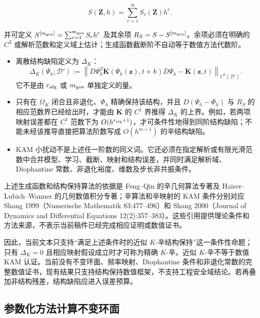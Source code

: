 \begin{equation}
\label{eq:symplectic-kam-5-14}
S\left( \mathbf{Z},h \right) = \sum_{r = 1}^{\infty}S_{r}\left( \mathbf{Z} \right)h^{r}.
\end{equation}

并可定义 \(S^{[m_{\rm gen}]}=\sum_{r=1}^{m_{\rm gen}}S_rh^r\) 及其余项 \(R_S=S-S^{[m_{\rm gen}]}\)。余项必须在明确的 \(C^{2}\) 或解析范数和定义域上估计；生成函数截断阶不自动等于数值方法代数阶。

\begin{itemize}
\tightlist
\item
  离散结构缺陷定义为 \(\Delta_K\)：
  \[
  \Delta_{K}(\Psi_h;\mathcal{D}'):=\left\|D\Psi_h^{T}\mathbf{K}\left(\Psi_h(\mathbf{z}),t+h\right)D\Psi_h-\mathbf{K}(\mathbf{z},t)\right\|_{C^{0}(\mathcal{D}')}.
  \]
  它不是由 \(r_{\rm alg}\) 或 \(m_{\rm gen}\) 单独定义的量。
\item
  只有在 \(\Omega_K\) 闭合且非退化、\(\Phi_h\) 精确保持该结构，并且 \(D(\Psi_h-\Phi_h)\) 与 \(R_S\) 的相应范数界已经给出时，才能由 \(\mathbf{K}\) 的 \(C^{1}\) 界推得 \(\Delta_K\) 的上界。例如，若两项映射误差都在 \(C^{1}\) 范数下为 \(O(h^{r_{\rm alg}+1})\)，才可条件性地得到同阶结构缺陷；不能未经该推导直接把算法阶数写成 \(O(h^{m+1})\) 的辛结构缺陷。
\item
  KAM 小扰动不是上述任一阶数的同义词。它还必须在指定解析或有限光滑范数中合并模型、学习、截断、映射和结构误差，并同时满足解析域、Diophantine 常数、非退化裕度、维数及步长非共振条件。
\end{itemize}

上述生成函数和结构保持算法的依据是 Feng--Qin 的辛几何算法专著及 Hairer--Lubich--Wanner 的几何数值积分专著；辛算法和辛映射的 KAM 条件分别对应 Shang 1999（Numerische Mathematik 83:477--496）和 Shang 2000（Journal of Dynamics and Differential Equations 12(2):357--383）\cite{FengQin2010,HairerLubichWanner2006GNI,Shang1999KAMAlgorithms,Shang2000KAMMappings}。这些引用提供理论条件和方法来源，不表示当前稿件已经完成相应证明或数值证书。

因此，当前文本只支持“满足上述条件时的近似 \(K\)-辛结构保持”这一条件性命题；只有 \(\Delta_K=0\) 且相应映射假设成立时才可称为精确 \(K\)-辛。近似 \(K\)-辛不等于数值 KAM 认证。当前没有不变环面、频率映射、Diophantine 条件和非退化常数的完整数值证书，现有结果只支持结构保持数值框架，不支持工程安全域结论。若再叠加非结构残差，结构缺陷应进入误差预算。

\subsection{参数化方法计算不变环面}\label{sec:symplectic-kam-5-6}

